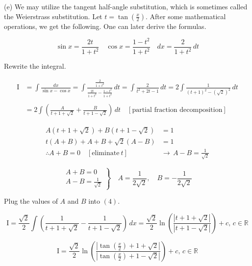 \documentclass{article}
\begin{document}
\hfill

\noindent (e) We may utilize the tangent half-angle substitution, which is sometimes called the Weierstrass substitution. Let $\displaystyle t = \tan\left(\frac x2\right)$. After some mathematical operations, we get the following. One can later derive the formulas.

\begin{equation*}
\sin x={\frac{2t}{1+t^{2}}}\quad\cos x={\frac{1-t^{2}}{1+t^{2}}}\quad dx={\frac2{1+t^{2}}}\,dt
\end{equation*}

\hfill

\noindent Rewrite the integral.

\begin{align}
\mathrm{I} &= \int\frac{dx}{\sin x - \cos x} = \int\frac{\frac2{1+t^2}}{\frac{2t}{1+t^2} -\frac{1-t^2}{1+t^2}}\,dt=\int\frac2{t^2+2t-1}\,dt=2\int\frac1{(t+1)^2-(\sqrt2)^2}\,dt\nonumber\\\nonumber\\&=2\int\left( \frac A{t+1+\sqrt2} + \frac B{t+1-\sqrt2}\right)\,dt\quad[\text{partial fraction decomposition}]
\end{align}

\begin{align*}
A(t+1+\sqrt2)+B(t+1-\sqrt2) &= 1\\
t(A+B) + A + B+\sqrt2(A-B) &= 1\\
\therefore A+B =0 \quad[\text{eliminate}\ t] \,&\rightarrow\, A- B= \frac1{\sqrt2}
\end{align*}

\[
\left.
\begin{array}{ll}
A+B=0  \\
\displaystyle A-B = \frac1{\sqrt2}
\end{array}
\right\}
\quad A=\frac1{2\sqrt2},\quad B=-\frac1{2\sqrt2}
\]

\hfill

\noindent Plug the values of $A$ and $B$ into $(4)$.

\begin{equation*}
\mathrm{I} =\frac{\sqrt2}2\int\left(\frac 1{t+1+\sqrt2} - \frac 1{t+1-\sqrt2}\right) \,dx = \frac{\sqrt2}2 \ln\left(\frac{|t+1+\sqrt2|}{|t+1-\sqrt2|}\right) +c,\,c\in\mathbb{R}\end{equation*}

\begin{equation*}
\boxed{\mathrm{I} = \frac{\sqrt2}2 \ln\left(\frac{\displaystyle\left|\tan\left(\frac x2\right)+1+\sqrt2\right|}{\displaystyle\left|\tan\left(\frac x2\right)+1-\sqrt2\right|}\right) +c,\,c\in\mathbb{R}}
\end{equation*}
\end{document}
